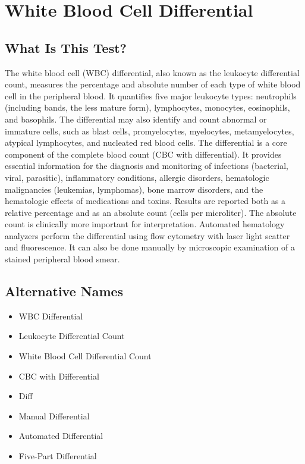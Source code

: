 \chapter{White Blood Cell Differential}

\section*{What Is This Test?}
The white blood cell (WBC) differential, also known as the leukocyte differential count, measures the percentage and absolute number of each type of white blood cell in the peripheral blood. It quantifies five major leukocyte types: neutrophils (including bands, the less mature form), lymphocytes, monocytes, eosinophils, and basophils. The differential may also identify and count abnormal or immature cells, such as blast cells, promyelocytes, myelocytes, metamyelocytes, atypical lymphocytes, and nucleated red blood cells. The differential is a core component of the complete blood count (CBC with differential). It provides essential information for the diagnosis and monitoring of infections (bacterial, viral, parasitic), inflammatory conditions, allergic disorders, hematologic malignancies (leukemias, lymphomas), bone marrow disorders, and the hematologic effects of medications and toxins. Results are reported both as a relative percentage and as an absolute count (cells per microliter). The absolute count is clinically more important for interpretation. Automated hematology analyzers perform the differential using flow cytometry with laser light scatter and fluorescence. It can also be done manually by microscopic examination of a stained peripheral blood smear.

\section*{Alternative Names}
\begin{itemize}
  \item WBC Differential
  \item Leukocyte Differential Count
  \item White Blood Cell Differential Count
  \item CBC with Differential
  \item Diff
  \item Manual Differential
  \item Automated Differential
  \item Five-Part Differential
\end{itemize}
